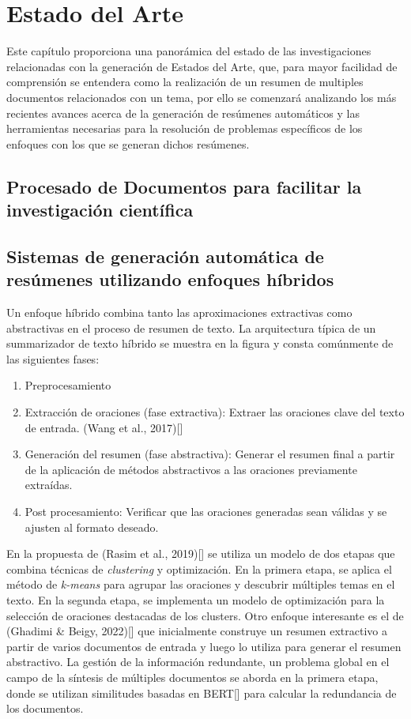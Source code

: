 \chapter{Estado del Arte}\label{chapter:state-of-the-art}
    Este capítulo proporciona una panorámica del estado de las investigaciones relacionadas con la generación de Estados del Arte, que, para mayor facilidad de comprensión se entendera como la realización de un resumen de multiples documentos relacionados con un tema, por ello se comenzará analizando los más recientes avances acerca de la generación de resúmenes automáticos y las herramientas necesarias para la resolución de problemas específicos de los enfoques con los que se generan dichos resúmenes.
\section{Procesado de Documentos para facilitar la investigación científica}


\section{Sistemas de generación automática de resúmenes utilizando enfoques híbridos}

Un enfoque híbrido combina tanto las aproximaciones extractivas como abstractivas en el proceso de resumen de texto. La arquitectura típica  de un summarizador de texto híbrido se muestra en la figura {} y consta comúnmente de las siguientes fases:


\begin{enumerate}
    \item Preprocesamiento
    \item Extracción de oraciones (fase extractiva): Extraer las oraciones clave del texto de entrada. (Wang et al., 2017)[\cite{Wang}]
    \item Generación del resumen (fase abstractiva): Generar el resumen final a partir de la aplicación de métodos abstractivos a las oraciones previamente extraídas.
    \item Post procesamiento: Verificar que las oraciones generadas sean válidas y se ajusten al formato deseado.
\end{enumerate}


En la propuesta de (Rasim et al., 2019)[\cite{cosum}] se utiliza un modelo de dos etapas que combina técnicas de \emph{clustering} y optimización. En la primera etapa, se aplica el método de \emph{k-means} para agrupar las oraciones y descubrir múltiples temas en el texto. En la segunda etapa, se implementa un modelo de optimización para la selección de oraciones destacadas de los clusters. Otro enfoque interesante es el de (Ghadimi \& Beigy, 2022)[\cite{hybrid-llm}] que inicialmente construye un resumen extractivo a partir de varios documentos de entrada y luego lo utiliza para generar el resumen abstractivo. La gestión de la información redundante, un problema global en el campo de la síntesis de múltiples documentos se aborda en la primera etapa, donde se utilizan similitudes basadas en BERT[\cite{BERT}] para calcular la redundancia de los documentos.

